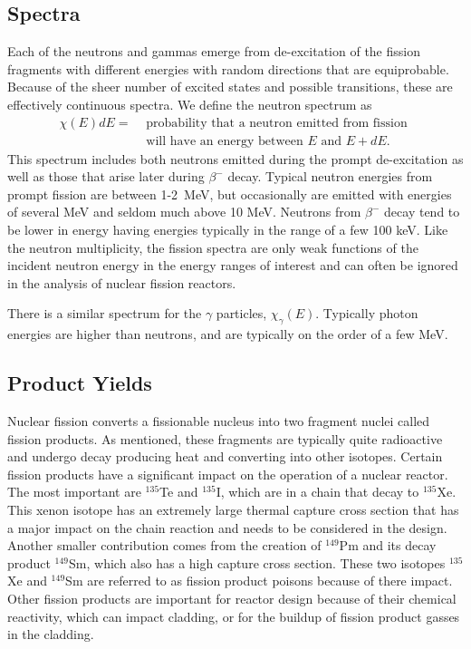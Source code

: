 \subsection{Spectra}

Each of the neutrons and gammas emerge from de-excitation of the fission fragments with different energies with random directions that are equiprobable. Because of the sheer number of excited states and possible transitions, these are effectively continuous spectra. We define the neutron spectrum as
\begin{align}
  \chi(E) dE = 	&\text{ probability that a neutron emitted from fission } \nonumber \\
  				&\text{ will have an energy between $E$ and $E + dE$.} \nonumber
\end{align}
This spectrum includes both neutrons emitted during the prompt de-excitation as well as those that arise later during $\beta^-$ decay. Typical neutron energies from prompt fission are between 1-2~MeV, but occasionally are emitted with energies of several MeV and seldom much above 10 MeV. Neutrons from $\beta^-$ decay tend to be lower in energy having energies typically in the range of a few 100 keV. Like the neutron multiplicity, the fission spectra are only weak functions of the incident neutron energy in the energy ranges of interest and can often be ignored in the analysis of nuclear fission reactors.

There is a similar spectrum for the $\gamma$ particles, $\chi_\gamma(E)$. Typically photon energies are higher than neutrons, and are typically on the order of a few MeV.

\subsection{Product Yields}

Nuclear fission converts a fissionable nucleus into two fragment nuclei called fission products. As mentioned, these fragments are typically quite radioactive and undergo decay producing heat and converting into other isotopes. Certain fission products have a significant impact on the operation of a nuclear reactor. The most important are $^{135}$Te and $^{135}$I, which are in a chain that decay to $^{135}$Xe. This xenon isotope has an extremely large thermal capture cross section that has a major impact on the chain reaction and needs to be considered in the design. Another smaller contribution comes from the creation of $^{149}$Pm and its decay product $^{149}$Sm, which also has a high capture cross section. These two isotopes $^{135}$Xe and $^{149}$Sm are referred to as fission product poisons because of there impact. Other fission products are important for reactor design because of their chemical reactivity, which can impact cladding, or for the buildup of fission product gasses in the cladding.

